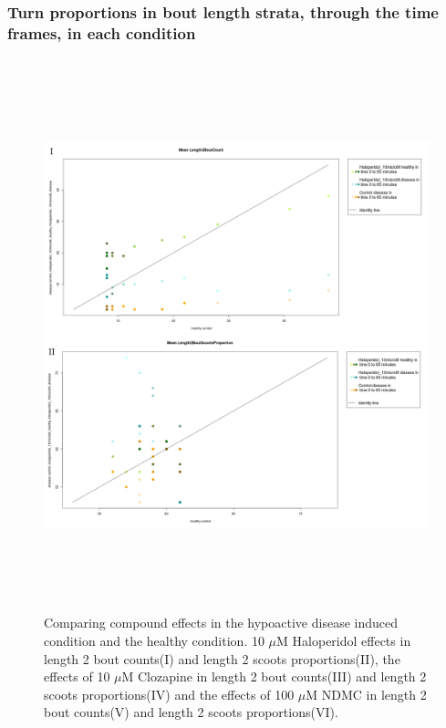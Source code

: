 \documentclass[a4paper,12pt]{article}
\begin{document}
\subsubsection{Turn proportions in bout length strata, through the time frames, in each condition}
\begin{figure}[h!]
\begin{center}
\caption{Comparing compound effects in the hypoactive disease induced condition and the healthy condition. 10 $\mu$M Haloperidol effects in length 2 bout counts(I) and length 2 scoots proportions(II), the effects of 10 $\mu$M Clozapine in length 2 bout counts(III) and length 2 scoots proportions(IV) and the effects of 100 $\mu$M NDMC in length 2 bout counts(V) and length 2 scoots proportions(VI).}
\includegraphics[width=15cm,height=16cm]{ApoLowCountScootsH.png}
\end{center}
\end{figure}
\newpage
\end{document}
